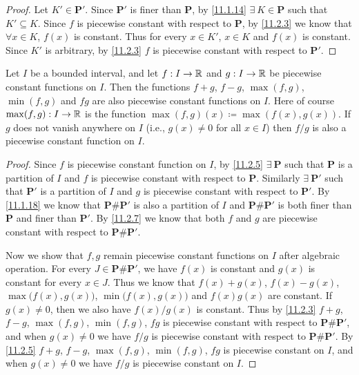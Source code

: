 \begin{proof}
  Let \(K' \in \mathbf{P}'\).
  Since \(\mathbf{P}'\) is finer than \(\mathbf{P}\), by \cref{11.1.14} \(\exists\ K \in \mathbf{P}\) such that \(K' \subseteq K\).
  Since \(f\) is piecewise constant with respect to \(\mathbf{P}\), by \cref{11.2.3} we know that \(\forall x \in K\), \(f(x)\) is constant.
  Thus for every \(x \in K'\), \(x \in K\) and \(f(x)\) is constant.
  Since \(K'\) is arbitrary, by \cref{11.2.3} \(f\) is piecewise constant with respect to \(\mathbf{P}'\).
\end{proof}

\begin{lem}\label{11.2.8}
  Let \(I\) be a bounded interval, and let \(f : I \to \mathbb{R}\) and \(g : I \to \mathbb{R}\) be piecewise constant functions on \(I\).
  Then the functions \(f + g\), \(f - g\), \(\max(f, g)\), \(\min(f, g)\) and \(fg\) are also piecewise constant functions on \(I\).
  Here of course \(\max(f, g) : I \to \mathbb{R}\) is the function \(\max(f, g)(x) \coloneqq \max(f(x), g(x))\).
  If \(g\) does not vanish anywhere on \(I\) (i.e., \(g(x) \neq 0\) for all \(x \in I\)) then \(f / g\) is also a piecewise constant function on \(I\).
\end{lem}

\begin{proof}
  Since \(f\) is piecewise constant function on \(I\), by \cref{11.2.5} \(\exists\ \mathbf{P}\) such that \(\mathbf{P}\) is a partition of \(I\) and \(f\) is piecewise constant with respect to \(\mathbf{P}\).
  Similarly \(\exists\ \mathbf{P}'\) such that \(\mathbf{P}'\) is a partition of \(I\) and \(g\) is piecewise constant with respect to \(\mathbf{P}'\).
  By \cref{11.1.18} we know that \(\mathbf{P} \# \mathbf{P}'\) is also a partition of \(I\) and \(\mathbf{P} \# \mathbf{P}'\) is both finer than \(\mathbf{P}\) and finer than \(\mathbf{P}'\).
  By \cref{11.2.7} we know that both \(f\) and \(g\) are piecewise constant with respect to \(\mathbf{P} \# \mathbf{P}'\).

  Now we show that \(f, g\) remain piecewise constant functions on \(I\) after algebraic operation.
  For every \(J \in \mathbf{P} \# \mathbf{P}'\), we have \(f(x)\) is constant and \(g(x)\) is constant for every \(x \in J\).
  Thus we know that \(f(x) + g(x)\), \(f(x) - g(x)\), \(\max\big(f(x), g(x)\big)\), \(\min\big(f(x), g(x)\big)\) and \(f(x) g(x)\) are constant.
  If \(g(x) \neq 0\), then we also have \(f(x) / g(x)\) is constant.
  Thus by \cref{11.2.3} \(f + g\), \(f - g\), \(\max(f, g)\), \(\min(f, g)\), \(fg\) is piecewise constant with respect to \(\mathbf{P} \# \mathbf{P}'\), and when \(g(x) \neq 0\) we have \(f / g\) is piecewise constant with respect to \(\mathbf{P} \# \mathbf{P}'\).
  By \cref{11.2.5} \(f + g\), \(f - g\), \(\max(f, g)\), \(\min(f, g)\), \(fg\) is piecewise constant on \(I\), and when \(g(x) \neq 0\) we have \(f / g\) is piecewise constant on \(I\).
\end{proof}

